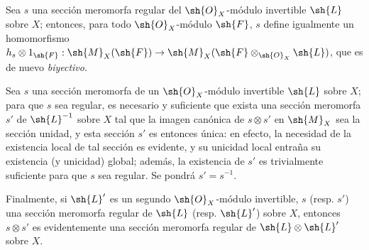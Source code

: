\begin{env}[20.1.9]
\label{IV.20.1.9}
Sea $s$ una sección meromorfa regular del $\sh{O}_X$-módulo invertible $\sh{L}$ sobre $X$; entonces, para todo $\sh{O}_X$-módulo $\sh{F}$, $s$ define igualmente un homomorfismo $h_s\otimes1_{\sh{F}}:\sh{M}_X(\sh{F})\to\sh{M}_X(\sh{F}\otimes_{\sh{O}_X}\sh{L})$, que es de nuevo \emph{biyectivo}.
\end{env}

\begin{env}[20.1.10]
\label{IV.20.1.10}
Sea $s$ una sección meromorfa de un $\sh{O}_X$-módulo invertible $\sh{L}$ sobre $X$; para que $s$ sea regular, es necesario y suficiente que exista una sección meromorfa $s'$ de $\sh{L}^{-1}$ sobre $X$ tal que la imagen canónica de $s\otimes s'$ en $\sh{M}_X$  sea la sección unidad, y esta sección $s'$ es entonces única: en efecto, la necesidad de la existencia local de tal sección es evidente, y su unicidad local entraña su existencia (y unicidad) global; además, la existencia de $s'$ es trivialmente suficiente para que $s$ sea regular.
Se pondrá $s'=s^{-1}$.

Finalmente, si $\sh{L}'$ es un segundo $\sh{O}_X$-módulo invertible, $s$ (resp. $s'$) una sección meromorfa regular de $\sh{L}$ (resp. $\sh{L}'$) sobre $X$, entonces $s\otimes s'$ es evidentemente una sección meromorfa regular de $\sh{L}\otimes\sh{L}'$ sobre $X$.
\end{env}

